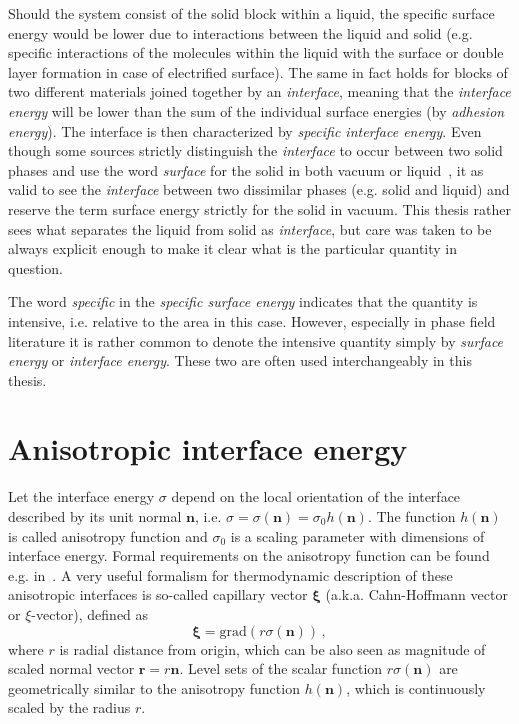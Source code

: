 Should the system consist of the solid block within a liquid, the specific surface energy would be lower due to interactions between the liquid and solid (e.g. specific interactions of the molecules within the liquid with the surface or double layer formation in case of electrified surface). The same in fact holds for blocks of two different materials joined together by an \textit{interface}, meaning that the \textit{interface energy} will be lower than the sum of the individual surface energies (by \textit{adhesion energy}). The interface is then characterized by \textit{specific interface energy}. Even though some sources strictly distinguish the \textit{interface} to occur between two solid phases and use the word \textit{surface} for the solid in both vacuum or liquid~\cite{Milchev2002}, it as valid to see the \textit{interface} between two dissimilar phases (e.g. solid and liquid) and reserve the term surface energy strictly for the solid in vacuum. This thesis rather sees what separates the liquid from solid as \textit{interface}, but care was taken to be always explicit enough to make it clear what is the particular quantity in question.

The word \textit{specific} in the \textit{specific surface energy} indicates that the quantity is intensive, i.e. relative to the area in this case. However, especially in phase field literature it is rather common to denote the intensive quantity simply by \textit{surface energy} or \textit{interface energy}. These two are often used interchangeably in this thesis.


\section{Anisotropic interface energy}
Let the interface energy $\sigma$ depend on the local orientation of the interface described by its unit normal $\bm{n}$, i.e. $\sigma=\sigma(\bm{n})=\sigma_0 h(\bm{n})$. The function $h(\bm{n})$ is called anisotropy function and $\sigma_0$  is a scaling parameter with dimensions of interface energy. Formal requirements on the anisotropy function can be found e.g. in~\cite{Kobayashi2001}. A very useful formalism for thermodynamic description of these anisotropic interfaces is so-called capillary vector $\bm{\xi}$ (a.k.a. Cahn-Hoffmann vector or $\xi$-vector), defined as~\cite{Hoffman1972,Cahn1974}
\begin{equation}
    \bm{\xi} = \mathrm{grad}(r\sigma(\bm{n}))\,,
\end{equation}
where $r$ is radial distance from origin, which can be also seen as magnitude of scaled normal vector $\bm{r}=r\bm{n}$. Level sets of the scalar function $r\sigma(\bm{n})$ are geometrically similar to the anisotropy function $h(\bm{n})$, which is continuously scaled by the radius $r$.

